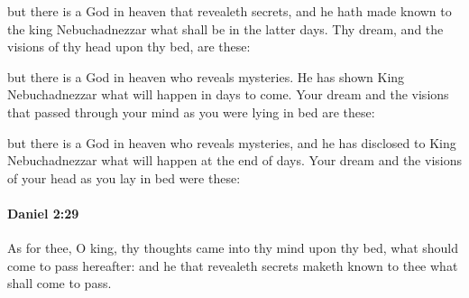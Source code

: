 			\begin{versebox}
					\item[BHS] 
					\item[LXX] 
					\item[ASV] but there is a God in heaven that revealeth secrets, and he hath made known to the king Nebuchadnezzar what shall be in the latter days. Thy dream, and the visions of thy head upon thy bed, are these:
					\item[NIV] but there is a God in heaven who reveals mysteries. He has shown King Nebuchadnezzar what will happen in days to come. Your dream and the visions that passed through your mind as you were lying in bed are these:
					\item[NRSV] but there is a God in heaven who reveals mysteries, and he has disclosed to King Nebuchadnezzar what will happen at the end of days. Your dream and the visions of your head as you lay in bed were these:
			\end{versebox}

		\paragraph{Daniel 2:29} %
			\label{DANIEL-2-29}

			As for thee, O king, thy thoughts came into thy mind upon thy bed, what should come to pass hereafter: and he that revealeth secrets maketh known to thee what shall come to pass.

